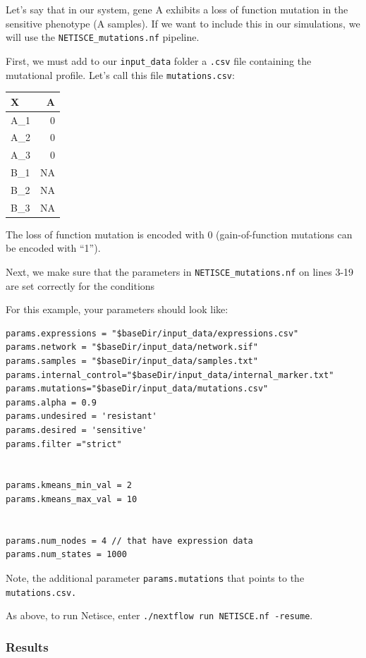 \documentclass[
]{book}
\begin{document}
Let's say that in our system, gene A exhibits a loss of function mutation in the sensitive phenotype (A samples). If we want to include this in our simulations, we will use the \texttt{NETISCE\_mutations.nf} pipeline.

First, we must add to our \texttt{input\_data} folder a \texttt{.csv} file containing the mutational profile. Let's call this file \texttt{mutations.csv}:

\begin{tabular}{l|r}
\hline
X & A\\
\hline
A\_1 & 0\\
\hline
A\_2 & 0\\
\hline
A\_3 & 0\\
\hline
B\_1 & NA\\
\hline
B\_2 & NA\\
\hline
B\_3 & NA\\
\hline
\end{tabular}

The loss of function mutation is encoded with 0 (gain-of-function mutations can be encoded with ``1'').

Next, we make sure that the parameters in \texttt{NETISCE\_mutations.nf} on lines 3-19 are set correctly for the conditions

For this example, your parameters should look like:

\begin{verbatim}
params.expressions = "$baseDir/input_data/expressions.csv"
params.network = "$baseDir/input_data/network.sif"
params.samples = "$baseDir/input_data/samples.txt"
params.internal_control="$baseDir/input_data/internal_marker.txt"
params.mutations="$baseDir/input_data/mutations.csv"
params.alpha = 0.9
params.undesired = 'resistant'
params.desired = 'sensitive'
params.filter ="strict"


params.kmeans_min_val = 2
params.kmeans_max_val = 10


params.num_nodes = 4 // that have expression data
params.num_states = 1000
\end{verbatim}

Note, the additional parameter \texttt{params.mutations} that points to the \texttt{mutations.csv.}

As above, to run Netisce, enter \texttt{./nextflow\ run\ NETISCE.nf\ -resume}.

\hypertarget{section-id}{%
\subsubsection*{Results}\label{section-id}}
\end{document}
